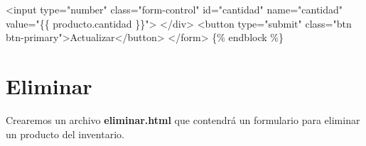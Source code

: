 \documentclass[
  a4paper,
  DIV=11,
  numbers=noendperiod,
  onepage,
  openany]{scrreprt}
\newenvironment{Shaded}{\begin{snugshade}}{\end{snugshade}}
\newcommand{\DataTypeTok}[1]{\textcolor[rgb]{0.68,0.00,0.00}{#1}}
\newcommand{\KeywordTok}[1]{\textcolor[rgb]{0.00,0.23,0.31}{#1}}
\newcommand{\NormalTok}[1]{\textcolor[rgb]{0.00,0.23,0.31}{#1}}
\newcommand{\OperatorTok}[1]{\textcolor[rgb]{0.37,0.37,0.37}{#1}}
\newcommand{\OtherTok}[1]{\textcolor[rgb]{0.00,0.23,0.31}{#1}}
\newcommand{\StringTok}[1]{\textcolor[rgb]{0.13,0.47,0.30}{#1}}
\begin{document}
\begin{Shaded}
\begin{Highlighting}[]
        \DataTypeTok{\textless{}}\KeywordTok{input}\OtherTok{ type}\OperatorTok{=}\StringTok{"number"}\OtherTok{ class}\OperatorTok{=}\StringTok{"form{-}control"}\OtherTok{ id}\OperatorTok{=}\StringTok{"cantidad"}\OtherTok{ name}\OperatorTok{=}\StringTok{"cantidad"}\OtherTok{ value}\OperatorTok{=}\StringTok{"\{\{ producto.cantidad \}\}"}\DataTypeTok{\textgreater{}}
    \DataTypeTok{\textless{}/}\KeywordTok{div}\DataTypeTok{\textgreater{}}
    \DataTypeTok{\textless{}}\KeywordTok{button}\OtherTok{ type}\OperatorTok{=}\StringTok{"submit"}\OtherTok{ class}\OperatorTok{=}\StringTok{"btn btn{-}primary"}\DataTypeTok{\textgreater{}}\NormalTok{Actualizar}\DataTypeTok{\textless{}/}\KeywordTok{button}\DataTypeTok{\textgreater{}}
\DataTypeTok{\textless{}/}\KeywordTok{form}\DataTypeTok{\textgreater{}}
\NormalTok{\{\% endblock \%\}}
\end{Highlighting}
\end{Shaded}

\section{Eliminar}\label{eliminar}

Crearemos un archivo \textbf{eliminar.html} que contendrá un formulario
para eliminar un producto del inventario.
\end{document}
